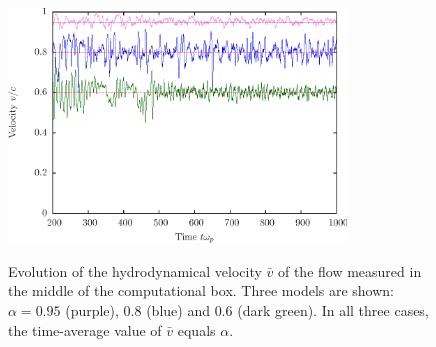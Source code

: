 \begin{figure}[h]
\begin{center}
\includegraphics[width=0.8\textwidth]{pics/chap2/f4.eps}\\
\caption[Evolution of $\bar{v}$ over time in the center of the domain]{Evolution
  of the hydrodynamical velocity $\bar{v}$ of the flow measured in the middle of
  the computational box. Three models are shown:
      $\alpha = 0.95$ (purple), $0.8$ (blue) and $0.6$ (dark green). In all
      three cases, the time-average value of $\bar{v}$ equals $\alpha$. }
    \label{fig:meanvelocity}
    \end{center}
\end{figure}

